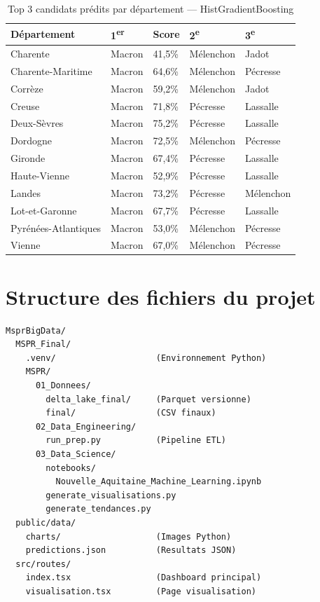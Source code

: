 \begin{table}[H]
\centering
\caption{Top 3 candidats prédits par département — HistGradientBoosting}
\label{tab:dept_detail}
\begin{tabular}{lllll}
\toprule
\textbf{Département} & \textbf{1\textsuperscript{er}} & \textbf{Score} & \textbf{2\textsuperscript{e}} & \textbf{3\textsuperscript{e}} \\
\midrule
Charente            & Macron    & 41,5\% & Mélenchon & Jadot \\
Charente-Maritime   & Macron    & 64,6\% & Mélenchon & Pécresse \\
Corrèze             & Macron    & 59,2\% & Mélenchon & Jadot \\
Creuse              & Macron    & 71,8\% & Pécresse  & Lassalle \\
Deux-Sèvres         & Macron    & 75,2\% & Pécresse  & Lassalle \\
Dordogne            & Macron    & 72,5\% & Mélenchon & Pécresse \\
Gironde             & Macron    & 67,4\% & Pécresse  & Lassalle \\
Haute-Vienne        & Macron    & 52,9\% & Pécresse  & Lassalle \\
Landes              & Macron    & 73,2\% & Pécresse  & Mélenchon \\
Lot-et-Garonne      & Macron    & 67,7\% & Pécresse  & Lassalle \\
Pyrénées-Atlantiques & Macron   & 53,0\% & Mélenchon & Pécresse \\
Vienne              & Macron    & 67,0\% & Mélenchon & Pécresse \\
\bottomrule
\end{tabular}
\end{table}

\chapter{Structure des fichiers du projet}
\label{ann:structure}

\begin{verbatim}
MsprBigData/
  MSPR_Final/
    .venv/                    (Environnement Python)
    MSPR/
      01_Donnees/
        delta_lake_final/     (Parquet versionne)
        final/                (CSV finaux)
      02_Data_Engineering/
        run_prep.py           (Pipeline ETL)
      03_Data_Science/
        notebooks/
          Nouvelle_Aquitaine_Machine_Learning.ipynb
        generate_visualisations.py
        generate_tendances.py
  public/data/
    charts/                   (Images Python)
    predictions.json          (Resultats JSON)
  src/routes/
    index.tsx                 (Dashboard principal)
    visualisation.tsx         (Page visualisation)
\end{verbatim}

